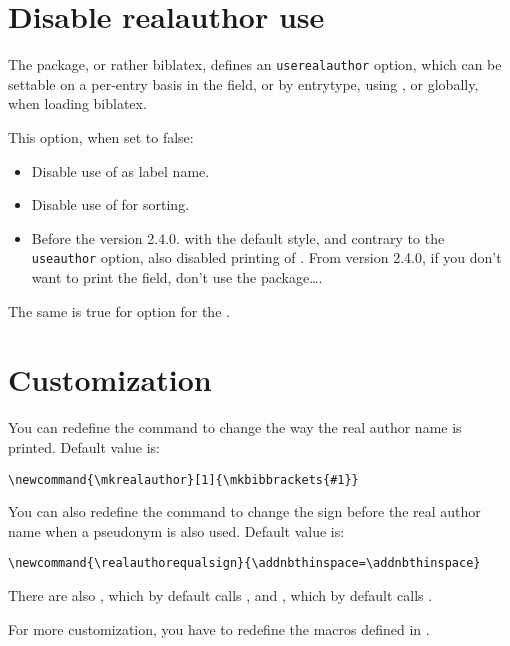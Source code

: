 \documentclass{ltxdockit}[2011/03/25]
\newcommand{\biblatex}{biblatex\xspace}
\begin{document}
\section{Disable realauthor use}\label{userealauthor}

The package, or rather \biblatex, defines an \verb+userealauthor+ option, which can be settable on a per-entry basis in the  field, or by entrytype, using , or globally, when loading \biblatex. 

This option, when set to false:
\begin{itemize}
	\item Disable use of  as label name.
	\item Disable use of  for sorting.
	\item Before the version 2.4.0. with the default style, and contrary to the \verb+useauthor+ option, also disabled printing of . From version 2.4.0, if you don't want to print the field, don't use the package\ldots.
\end{itemize}

The same is true for  option for the . 

\section{Customization}

You can redefine the  command to change the way the real author name is printed. Default value is:

\begin{verbatim}
\newcommand{\mkrealauthor}[1]{\mkbibbrackets{#1}}
\end{verbatim}

You can also redefine the  command to change the sign before the real author name when a pseudonym is also used. Default value is:

\begin{verbatim}
\newcommand{\realauthorequalsign}{\addnbthinspace=\addnbthinspace}
\end{verbatim}

There are also , which by default calls , and , which by default calls .

For more customization, you have to redefine the macros defined in .
\end{document}
